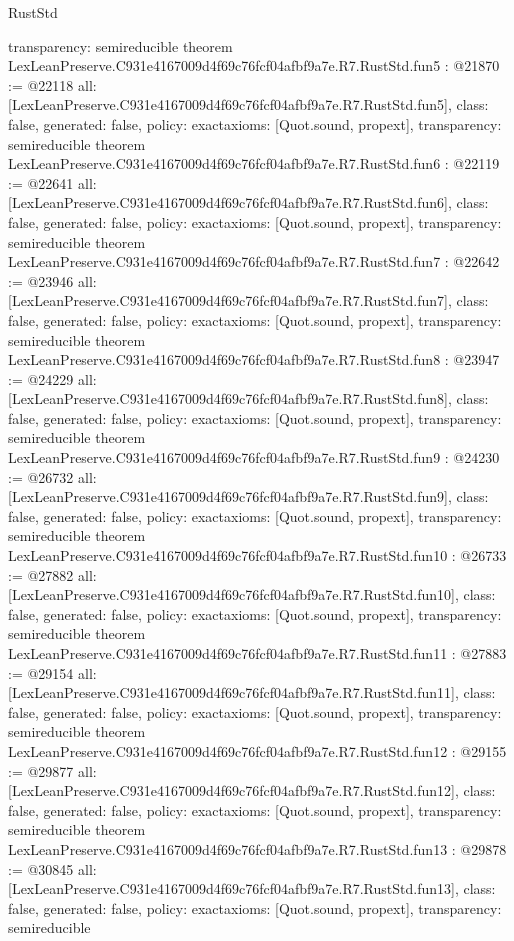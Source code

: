 \begin{lexlean}{RustStd}
\begin{coremodule}
{  transparency: semireducible
}
theorem LexLeanPreserve.C931e4167009d4f69c76fcf04afbf9a7e.R7.RustStd.fun5 : @21870 := @22118 {
  all: [LexLeanPreserve.C931e4167009d4f69c76fcf04afbf9a7e.R7.RustStd.fun5],
  class: false,
  generated: false,
  policy: exact{axioms: [Quot.sound, propext]},
  transparency: semireducible
}
theorem LexLeanPreserve.C931e4167009d4f69c76fcf04afbf9a7e.R7.RustStd.fun6 : @22119 := @22641 {
  all: [LexLeanPreserve.C931e4167009d4f69c76fcf04afbf9a7e.R7.RustStd.fun6],
  class: false,
  generated: false,
  policy: exact{axioms: [Quot.sound, propext]},
  transparency: semireducible
}
theorem LexLeanPreserve.C931e4167009d4f69c76fcf04afbf9a7e.R7.RustStd.fun7 : @22642 := @23946 {
  all: [LexLeanPreserve.C931e4167009d4f69c76fcf04afbf9a7e.R7.RustStd.fun7],
  class: false,
  generated: false,
  policy: exact{axioms: [Quot.sound, propext]},
  transparency: semireducible
}
theorem LexLeanPreserve.C931e4167009d4f69c76fcf04afbf9a7e.R7.RustStd.fun8 : @23947 := @24229 {
  all: [LexLeanPreserve.C931e4167009d4f69c76fcf04afbf9a7e.R7.RustStd.fun8],
  class: false,
  generated: false,
  policy: exact{axioms: [Quot.sound, propext]},
  transparency: semireducible
}
theorem LexLeanPreserve.C931e4167009d4f69c76fcf04afbf9a7e.R7.RustStd.fun9 : @24230 := @26732 {
  all: [LexLeanPreserve.C931e4167009d4f69c76fcf04afbf9a7e.R7.RustStd.fun9],
  class: false,
  generated: false,
  policy: exact{axioms: [Quot.sound, propext]},
  transparency: semireducible
}
theorem LexLeanPreserve.C931e4167009d4f69c76fcf04afbf9a7e.R7.RustStd.fun10 : @26733 := @27882 {
  all: [LexLeanPreserve.C931e4167009d4f69c76fcf04afbf9a7e.R7.RustStd.fun10],
  class: false,
  generated: false,
  policy: exact{axioms: [Quot.sound, propext]},
  transparency: semireducible
}
theorem LexLeanPreserve.C931e4167009d4f69c76fcf04afbf9a7e.R7.RustStd.fun11 : @27883 := @29154 {
  all: [LexLeanPreserve.C931e4167009d4f69c76fcf04afbf9a7e.R7.RustStd.fun11],
  class: false,
  generated: false,
  policy: exact{axioms: [Quot.sound, propext]},
  transparency: semireducible
}
theorem LexLeanPreserve.C931e4167009d4f69c76fcf04afbf9a7e.R7.RustStd.fun12 : @29155 := @29877 {
  all: [LexLeanPreserve.C931e4167009d4f69c76fcf04afbf9a7e.R7.RustStd.fun12],
  class: false,
  generated: false,
  policy: exact{axioms: [Quot.sound, propext]},
  transparency: semireducible
}
theorem LexLeanPreserve.C931e4167009d4f69c76fcf04afbf9a7e.R7.RustStd.fun13 : @29878 := @30845 {
  all: [LexLeanPreserve.C931e4167009d4f69c76fcf04afbf9a7e.R7.RustStd.fun13],
  class: false,
  generated: false,
  policy: exact{axioms: [Quot.sound, propext]},
  transparency: semireducible
}
\end{coremodule}
\end{lexlean}
